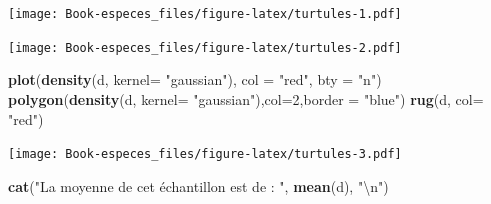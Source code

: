 \documentclass[
]{book}
\newenvironment{Shaded}{\begin{snugshade}}{\end{snugshade}}
\newcommand{\CharTok}[1]{\textcolor[rgb]{0.31,0.60,0.02}{#1}}
\newcommand{\CommentTok}[1]{\textcolor[rgb]{0.56,0.35,0.01}{\textit{#1}}}
\newcommand{\DataTypeTok}[1]{\textcolor[rgb]{0.13,0.29,0.53}{#1}}
\newcommand{\DecValTok}[1]{\textcolor[rgb]{0.00,0.00,0.81}{#1}}
\newcommand{\KeywordTok}[1]{\textcolor[rgb]{0.13,0.29,0.53}{\textbf{#1}}}
\newcommand{\NormalTok}[1]{#1}
\newcommand{\OperatorTok}[1]{\textcolor[rgb]{0.81,0.36,0.00}{\textbf{#1}}}
\newcommand{\StringTok}[1]{\textcolor[rgb]{0.31,0.60,0.02}{#1}}
\begin{document}
\texttt{[image: Book-especes\_files/figure-latex/turtules-1.pdf]}

\begin{Shaded}
\end{Shaded}

\texttt{[image: Book-especes\_files/figure-latex/turtules-2.pdf]}

\begin{Shaded}
\begin{Highlighting}[]
\KeywordTok{plot}\NormalTok{(}\KeywordTok{density}\NormalTok{(d, }\DataTypeTok{kernel=} \StringTok{"gaussian"}\NormalTok{), }\DataTypeTok{col =} \StringTok{"red"}\NormalTok{, }\DataTypeTok{bty =} \StringTok{"n"}\NormalTok{)}
\KeywordTok{polygon}\NormalTok{(}\KeywordTok{density}\NormalTok{(d, }\DataTypeTok{kernel=} \StringTok{"gaussian"}\NormalTok{),}\DataTypeTok{col=}\DecValTok{2}\NormalTok{,}\DataTypeTok{border =} \StringTok{"blue"}\NormalTok{)}
\KeywordTok{rug}\NormalTok{(d, }\DataTypeTok{col=} \StringTok{"red"}\NormalTok{)}
\end{Highlighting}
\end{Shaded}

\texttt{[image: Book-especes\_files/figure-latex/turtules-3.pdf]}

\begin{Shaded}
\begin{Highlighting}[]
\KeywordTok{cat}\NormalTok{(}\StringTok{"La moyenne de cet échantillon est de : "}\NormalTok{, }\KeywordTok{mean}\NormalTok{(d), }\StringTok{"}\CharTok{\textbackslash{}n}\StringTok{"}\NormalTok{)}
\end{Highlighting}
\end{Shaded}
\end{document}
